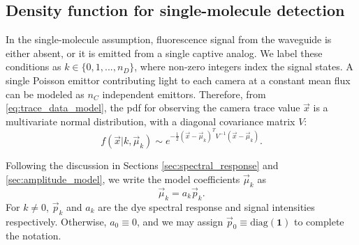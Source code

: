 \documentclass[10pt]{article}
\newcommand{\half}{\frac{1}{2}}
\newcommand{\ie}{\emph{i.e.}}
\newcommand{\cmos}{{\small CMOS}}
\begin{document}
\subsection{Density function for single-molecule detection}

In the single-molecule assumption, fluorescence signal from the waveguide is either absent, or it is emitted from a single captive analog.
We label these conditions as $k \in \{0,1,...,n_D\}$, where non-zero integers index the signal states.
A single Poisson emittor contributing light to each camera at a constant mean flux can be modeled as $n_C$ independent emittors.
Therefore, from \eqref{eq:trace_data_model}, the pdf for observing the camera trace value $\vec{x}$ is a multivariate normal distribution, with a diagonal covariance matrix $V$:
\begin{equation}
\label{eq:detect_pdf}
f(\vec{x}|k,\vec{\mu}_k) \sim e^{-\half(\vec{x}-\vec{\mu}_k)^T V^{-1} (\vec{x}-\vec{\mu}_k)}.
\end{equation}

Following the discussion in Sections \ref{sec:spectral_response} and \ref{sec:amplitude_model}, we write the model coefficients $\vec{\mu}_k$ as
\begin{equation}
\vec{\mu}_k = a_k \vec{p}_k.
\end{equation}
For $k\neq0$, $\vec{p}_k$ and $a_k$ are the dye spectral response and signal intensities respectively.
Otherwise, $a_0 \equiv 0$, and we may assign $\vec{p}_0 \equiv \text{diag}(\boldsymbol{1})$ to complete the notation.
\end{document}
